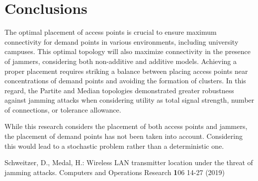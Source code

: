 \documentclass[runningheads]{llncs}
\begin{document}
	
	\section{Conclusions}
	
	The optimal placement of access points is crucial to ensure maximum connectivity for demand points in various environments, including university campuses. This optimal topology will also maximize connectivity in the presence of jammers, considering both non-additive and additive models.
	Achieving a proper placement requires striking a balance between placing access points near concentrations of demand points and avoiding the formation of clusters.	In this regard, the Partite and Median topologies demonstrated greater robustness against jamming attacks when considering utility as total signal strength, number of connections, or tolerance allowance.
	
	While this research considers the placement of both access points and jammers, the placement of demand points has not been taken into account. Considering this would lead to a stochastic problem rather than a deterministic one.


 \begin{thebibliography}{8}
		Schweitzer, D., Medal, H.: Wireless LAN transmitter location under the threat of jamming attacks. Computers and Operations Research \textbf 106 14-27 (2019)
	\end{thebibliography}
\end{document}
